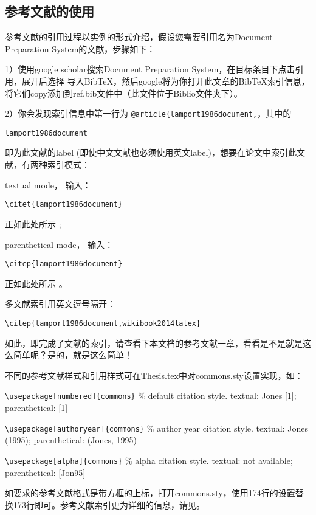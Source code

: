 \subsection{参考文献的使用}

参考文献的引用过程以实例的形式介绍，假设您需要引用名为Document Preparation System的文献，步骤如下：

1）使用google scholar搜索Document Preparation System，在目标条目下点击引用，展开后选择 导入BibTeX，然后google将为你打开此文章的BibTeX索引信息，将它们copy添加到ref.bib文件中（此文件位于Biblio文件夹下）。

2）你会发现索引信息中第一行为 \verb|@article{lamport1986document,|，其中的 
    
    \verb|lamport1986document| 
    
即为此文献的label (即使中文文献也必须使用英文label)，想要在论文中索引此文献，有两种索引模式：

textual mode， 输入：

\verb|\citet{lamport1986document}|

正如此处所示 \citet{lamport1986document}; 

parenthetical mode， 输入：

\verb|\citep{lamport1986document}|

正如此处所示 \citep{lamport1986document}。

多文献索引用英文逗号隔开：

\verb|\citep{lamport1986document,wikibook2014latex}|

如此，即完成了文献的索引，请查看下本文档的参考文献一章，看看是不是就是这么简单呢？是的，就是这么简单！

不同的参考文献样式和引用样式可在Thesis.tex中对commons.sty设置实现，如：

\verb+\usepackage[numbered]{commons}+ $\%$ default citation style. textual: Jones [1]; parenthetical: [1]

\verb+\usepackage[authoryear]{commons}+ $\%$ author year citation style. textual: Jones (1995); parenthetical: (Jones, 1995)

\verb+\usepackage[alpha]{commons}+ $\%$ alpha citation style. textual: not available; parenthetical: [Jon95]

如要求的参考文献格式是带方框的上标，打开commons.sty，使用174行的设置替换173行即可。参考文献索引更为详细的信息，请见\citep{wikibook2014latex}。

\nocite{*}%
